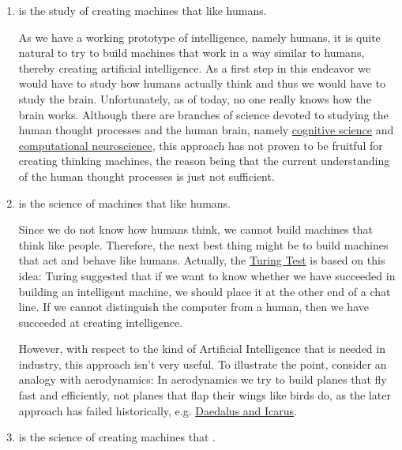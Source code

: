\begin{enumerate}
\item {} is the study of creating machines that  like humans.

      As we have a working prototype of intelligence, namely humans, it is quite natural to try to
      build machines that work in a way similar to humans, thereby creating artificial
      intelligence.  As a first step in this endeavor we would have to study how humans actually
      think and thus we would have to study the brain.  Unfortunately, as of today, no one really
      knows how the brain works.  Although there are branches of science devoted to studying the
      human thought processes and the human brain, namely
      \href{https://en.wikipedia.org/wiki/Cognitive_science}{cognitive science} and 
      \href{https://en.wikipedia.org/wiki/Computational_neuroscience}{computational neuroscience},
      this approach has not proven to be fruitful for creating thinking machines, the reason being
      that the current understanding of the human thought processes is just not sufficient.  

\item {} is the science of machines that  like humans.

      Since we do not know how humans think,  we cannot build machines that think like people.
      Therefore, the next best thing might be to build  machines that act and behave like humans.  
      Actually, the \href{https://en.wikipedia.org/wiki/Turing_test}{Turing Test} is based on this
      idea:  Turing suggested that if we want to know whether we have succeeded in building an
      intelligent machine, we should place it at the other end of a chat line.  If we cannot
      distinguish the computer from a human, then we have succeeded at creating intelligence. 

      However, with respect to the kind of Artificial Intelligence that is needed in industry, this
      approach isn't very useful.  To illustrate the point, consider an analogy with aerodynamics:
      In aerodynamics we try to build planes that fly fast and efficiently, not planes that flap
      their wings like birds do, as the later approach has failed historically, e.g. 
      \href{https://en.wikipedia.org/wiki/Daedalus#Daedalus_and_Icarus}{Daedalus and Icarus}.
\item {} is the science of creating machines that .


\end{enumerate}
